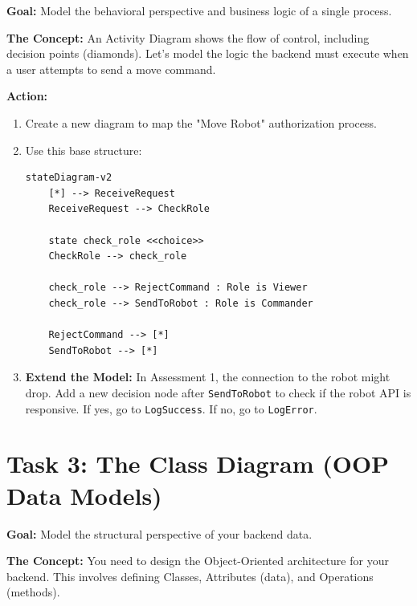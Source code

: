 \documentclass[a4paper,12pt]{article}
\begin{document}
\textbf{Goal:} Model the behavioral perspective and business logic of a single process.

\textbf{The Concept:} An Activity Diagram shows the flow of control, including decision points (diamonds). Let's model the logic the backend must execute when a user attempts to send a move command.

\vspace{0.3cm}
\textbf{Action:}
\begin{enumerate}
    \item Create a new diagram to map the "Move Robot" authorization process.
    \item Use this base structure:
    \begin{verbatim}
stateDiagram-v2
    [*] --> ReceiveRequest
    ReceiveRequest --> CheckRole
    
    state check_role <<choice>>
    CheckRole --> check_role
    
    check_role --> RejectCommand : Role is Viewer
    check_role --> SendToRobot : Role is Commander
    
    RejectCommand --> [*]
    SendToRobot --> [*]
    \end{verbatim}
    \item \textbf{Extend the Model:} In Assessment 1, the connection to the robot might drop. Add a new decision node after \texttt{SendToRobot} to check if the robot API is responsive. If yes, go to \texttt{LogSuccess}. If no, go to \texttt{LogError}.
\end{enumerate}


\section*{Task 3: The Class Diagram (OOP Data Models)}

\textbf{Goal:} Model the structural perspective of your backend data.

\textbf{The Concept:} You need to design the Object-Oriented architecture for your backend. This involves defining Classes, Attributes (data), and Operations (methods).
\end{document}
